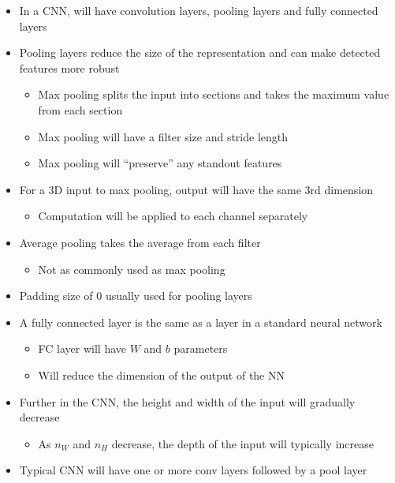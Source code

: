 \documentclass[12pt, letterpaper]{article}
\begin{document}
\begin{itemize}
        \item In a CNN, will have convolution layers, pooling layers and fully connected layers
        \item Pooling layers reduce the size of the representation and can make detected features more robust
        \begin{itemize}
            \item Max pooling splits the input into sections and takes the maximum value from each section
            \item Max pooling will have a filter size and stride length
            \item Max pooling will ``preserve'' any standout features 
        \end{itemize}
        \item For a 3D input to max pooling, output will have the same 3rd dimension
        \begin{itemize}
            \item Computation will be applied to each channel separately 
        \end{itemize}
        \item Average pooling takes the average from each filter
        \begin{itemize}
            \item Not as commonly used as max pooling
        \end{itemize}
        \item Padding size of 0 usually used for pooling layers
        \item A fully connected layer is the same as a layer in a standard neural network 
        \begin{itemize}
            \item FC layer will have $W$ and $b$ parameters
            \item Will reduce the dimension of the output of the NN
        \end{itemize}
        \item Further in the CNN, the height and width of the input will gradually decrease
        \begin{itemize}
            \item As $n_W$ and $n_H$ decrease, the depth of the input will typically increase
        \end{itemize}
        \item Typical CNN will have one or more conv layers followed by a pool layer
        \begin{itemize}

\end{itemize}
\end{itemize}
\end{document}
